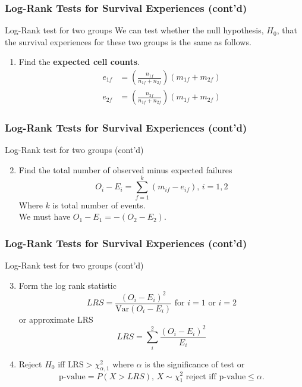 \documentclass{beamer}
\theoremstyle{definition}
\begin{document}
\begin{frame}
\frametitle{Log-Rank Tests for Survival Experiences (cont'd)}
\begin{block}{Log-Rank test for two groups}
We can test whether the null hypothesis, $H_0$, that the survival experiences for these two groups is the same as follows.
\begin{enumerate}
\item Find the \textbf{expected cell counts}.
\begin{align*}
e_{1f} & = \left(\frac{n_{1f}}{n_{1f} + n_{2f}}\right)(m_{1f} + m_{2f}) \\
e_{2f} & = \left(\frac{n_{2f}}{n_{1f} + n_{2f}}\right)(m_{1f} + m_{2f})
\end{align*}
\end{enumerate}
\end{block}
\end{frame}

\begin{frame}
\frametitle{Log-Rank Tests for Survival Experiences (cont'd)}
\begin{block}{Log-Rank test for two groups (cont'd)}

\begin{enumerate}
 \setcounter{enumi}{1}
\item Find the total number of observed minus expected failures
\[
O_i - E_i = \sum_{f=1}^k (m_{if} - e_{if}), \, i=1,2
\]
Where $k$ is total number of events. \\
We must have $O_1 - E_1 = -(O_2- E_2)$.
\end{enumerate}
\end{block}
\end{frame}

\begin{frame}
\frametitle{Log-Rank Tests for Survival Experiences (cont'd)}
\begin{block}{Log-Rank test for two groups (cont'd)}
 \begin{enumerate}
  \setcounter{enumi}{2}
\item Form the log rank statistic
\[
LRS = \frac{(O_i - E_i)^2}{\text{Var}(O_i-E_i)} \text{ for } i=1 \text{ or } i=2
\]
or approximate LRS
\[
LRS = \sum_i^{2} \frac{(O_i - E_i)^2}{E_i}
\]
\item Reject $H_0$ iff $\text{LRS} > \chi^2_{\alpha,1}$ where $\alpha$ is the significance of test or
\[
\text{p-value} = P(X>LRS), \,  X \sim \chi^2_1 \text{ reject iff p-value} \le \alpha.
\]
\end{enumerate}
\end{block}
\end{frame}
\end{document}
